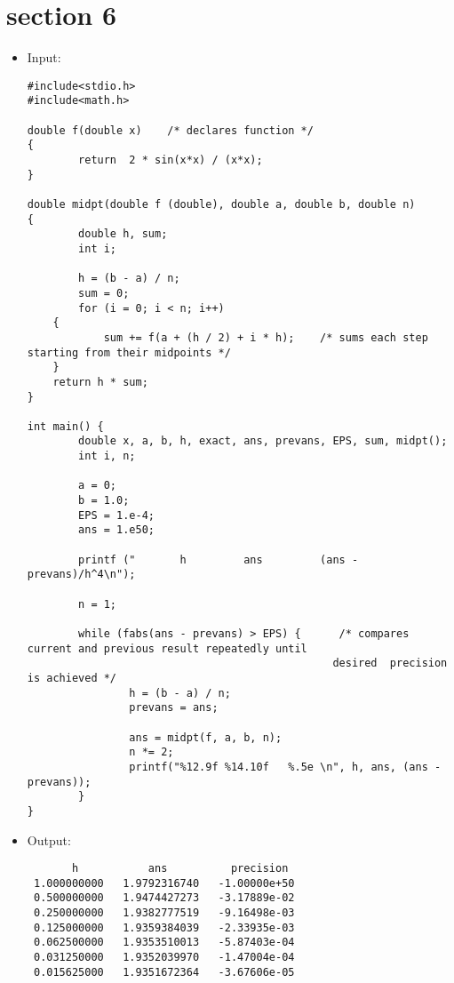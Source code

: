 \documentclass[10pt]{article}
\begin{document}
\section{section 6}
\begin{itemize}
 \item Input:
\begin{verbatim}
#include<stdio.h>
#include<math.h>

double f(double x)    /* declares function */
{
        return  2 * sin(x*x) / (x*x);
}

double midpt(double f (double), double a, double b, double n)
{
        double h, sum;
        int i;
        
        h = (b - a) / n;
        sum = 0;
        for (i = 0; i < n; i++)
	{
	        sum += f(a + (h / 2) + i * h);    /* sums each step starting from their midpoints */
	}
	return h * sum;
}

int main() {
        double x, a, b, h, exact, ans, prevans, EPS, sum, midpt();
        int i, n;

        a = 0;
        b = 1.0;
        EPS = 1.e-4;
        ans = 1.e50;
        
        printf ("       h         ans         (ans - prevans)/h^4\n");

        n = 1;
        
        while (fabs(ans - prevans) > EPS) {      /* compares current and previous result repeatedly until
												desired  precision is achieved */
                h = (b - a) / n;
                prevans = ans;
                
                ans = midpt(f, a, b, n);
                n *= 2;
                printf("%12.9f %14.10f   %.5e \n", h, ans, (ans - prevans));
        }
}
\end{verbatim}
\item Output:

\begin{verbatim}
       h           ans          precision
 1.000000000   1.9792316740   -1.00000e+50 
 0.500000000   1.9474427273   -3.17889e-02 
 0.250000000   1.9382777519   -9.16498e-03 
 0.125000000   1.9359384039   -2.33935e-03 
 0.062500000   1.9353510013   -5.87403e-04 
 0.031250000   1.9352039970   -1.47004e-04 
 0.015625000   1.9351672364   -3.67606e-05 

\end{verbatim}

\end{itemize}
\end{document}

